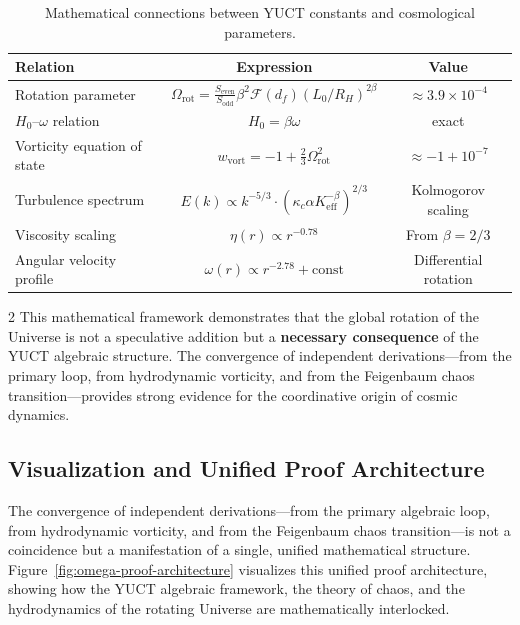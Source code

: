 \documentclass[12pt,a4paper]{article}
\begin{document}
	\begin{table}[htbp]
		\centering
		\caption{Mathematical connections between YUCT constants and cosmological parameters.}
		\label{tab:math-connections}
		\begin{tabular}{l c c}
			\toprule
			\textbf{Relation} & \textbf{Expression} & \textbf{Value} \\
			\midrule
			Rotation parameter & \(\Omega_{\mathrm{rot}} = \frac{S_{\mathrm{even}}}{S_{\mathrm{odd}}} \beta^2 \mathcal{F}(d_f) (L_0/R_H)^{2\beta}\) & \(\approx 3.9 \times 10^{-4}\) \\
			\(H_0\)–\(\omega\) relation & \(H_0 = \beta \omega\) & exact \\
			Vorticity equation of state & \(w_{\mathrm{vort}} = -1 + \frac{2}{3}\Omega_{\mathrm{rot}}^2\) & \(\approx -1 + 10^{-7}\) \\
			Turbulence spectrum & \(E(k) \propto k^{-5/3} \cdot (\kappa_c \alpha K_{\mathrm{eff}}^{-\beta})^{2/3}\) & Kolmogorov scaling \\
			Viscosity scaling & \(\eta(r) \propto r^{-0.78}\) & From \(\beta = 2/3\) \\
			Angular velocity profile & \(\omega(r) \propto r^{-2.78} + \text{const}\) & Differential rotation \\
			\bottomrule
		\end{tabular}
	\end{table}
	
	\begin{multicols}{2}
		This mathematical framework demonstrates that the global rotation of the Universe is not a speculative addition but a \textbf{necessary consequence} of the YUCT algebraic structure. The convergence of independent derivations---from the primary loop, from hydrodynamic vorticity, and from the Feigenbaum chaos transition---provides strong evidence for the coordinative origin of cosmic dynamics.
		
		\subsection{Visualization and Unified Proof Architecture}
		\label{subsec:visualization}
		
		The convergence of independent derivations---from the primary algebraic loop, from hydrodynamic vorticity, and from the Feigenbaum chaos transition---is not a coincidence but a manifestation of a single, unified mathematical structure. Figure~\ref{fig:omega-proof-architecture} visualizes this unified proof architecture, showing how the YUCT algebraic framework, the theory of chaos, and the hydrodynamics of the rotating Universe are mathematically interlocked.
		
	\end{multicols}
	
\end{document}
